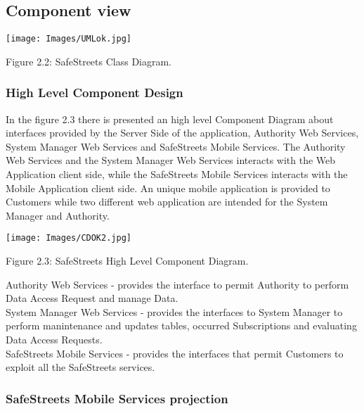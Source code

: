 \documentclass[12pt]{article}
\begin{document}
\subsection{Component view}
\vspace{5mm}
\begin{center}
\texttt{[image: Images/UMLok.jpg]}
\vspace{2mm}

Figure 2.2: SafeStreets Class Diagram.
\end{center}

\newpage
\subsubsection{High Level Component Design}
\vspace{5mm}
In the figure 2.3 there is presented an high level Component Diagram about interfaces provided by the Server Side of the application, Authority Web Services, System Manager Web Services and SafeStreets Mobile Services. The Authority Web Services and the System Manager Web Services interacts with the Web Application client side, while the SafeStreets Mobile Services interacts with the Mobile Application client side. An unique mobile application is provided to Customers while two different web application are intended for the System Manager and Authority.
\begin{center}
\texttt{[image: Images/CDOK2.jpg]}

\vspace{2mm}
Figure 2.3: SafeStreets High Level Component Diagram.
\end{center}

\newpage
\begin{flushleft}
Authority Web Services - provides the interface to permit Authority to perform Data Access Request and manage Data.
\vspace{2mm}\\
System Manager Web Services - provides the interfaces to System Manager to perform manintenance and updates tables, occurred Subscriptions and evaluating Data Access Requests.
\vspace{2mm}\\
SafeStreets Mobile Services - provides the interfaces that permit Customers to exploit all the SafeStreets services.
\end{flushleft}

\subsubsection{SafeStreets Mobile Services projection }
\vspace{5mm}
\end{document}
